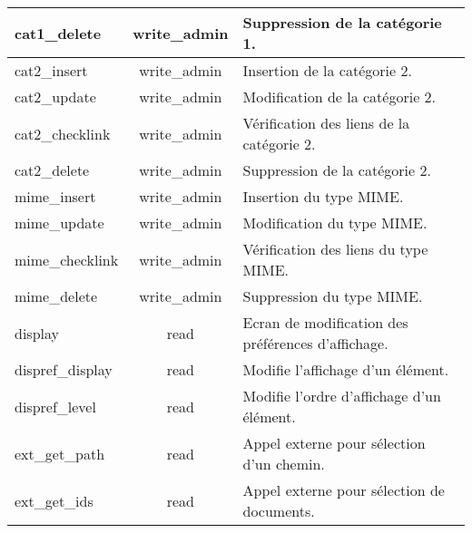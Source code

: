 \begin{tabular}{|l|c|p{9.5cm}|}
 \hline
  cat1\_delete & write\_admin & Suppression de la catégorie 1. \\
 \hline
  cat2\_insert & write\_admin & Insertion de la catégorie 2. \\
 \hline
  cat2\_update & write\_admin & Modification de la catégorie 2. \\
 \hline
  cat2\_checklink & write\_admin & Vérification des liens de la catégorie 2. \\
 \hline
  cat2\_delete & write\_admin & Suppression de la catégorie 2. \\
 \hline
  mime\_insert & write\_admin & Insertion du type MIME. \\
 \hline
  mime\_update & write\_admin & Modification du type MIME. \\
 \hline
  mime\_checklink & write\_admin & Vérification des liens du type MIME. \\
 \hline
  mime\_delete & write\_admin & Suppression du type MIME. \\
 \hline
  display & read & Ecran de modification des préférences d'affichage. \\
 \hline
  dispref\_display & read & Modifie l'affichage d'un élément. \\
 \hline
  dispref\_level & read & Modifie l'ordre d'affichage d'un élément. \\
 \hline
 \hline
  ext\_get\_path & read & Appel externe pour sélection d'un chemin. \\
 \hline
  ext\_get\_ids & read & Appel externe pour sélection de documents. \\
 \hline
\end{tabular}
